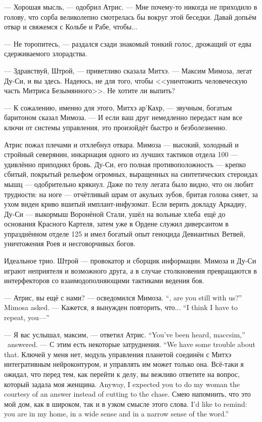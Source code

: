 --- Хорошая мысль, --- одобрил Атрис.
--- Мне почему-то никогда не приходило в голову, что сорба великолепно смотрелась бы вокруг этой беседки.
Давай допьём отвар и свяжемся с Кольбе и Рабе, чтобы...

--- Не торопитесь, --- раздался сзади знакомый тонкий голос, дрожащий от едва сдерживаемого злорадства.

--- Здравствуй, Штрой, --- приветливо сказала Митхэ.
--- Максим Мимоза, легат Ду-Си, и вы здесь.
Надеюсь, не для того, чтобы <<уничтожить человеческую часть Митриса Безымянного>>.
Не хотите ли выпить?

--- К сожалению, именно для этого, Митхэ ар’Кахр, --- звучным, богатым баритоном сказал Мимоза.
--- И если ваш друг немедленно передаст нам все ключи от системы управления, это произойдёт быстро и безболезненно.

Атрис пожал плечами и отхлебнул отвара.
Мимоза --- высокий, холодный и стройный северянин, инкарнация одного из лучших тактиков отдела 100 --- удивлённо приподнял бровь.
Ду-Си, его полная противоположность --- крепко сбитый, покрытый рельефом огромных, выращенных на синтетических стероидах мышц --- одобрительно крякнул.
Даже по телу легата было видно, что он любит трудности: на ноге --- отчётливый шрам от акульих зубов, бритая голова сияет, за ухом виден криво вшитый имплант-инфузомат.
Если верить докладу Аркадиу, Ду-Си --- выкормыш Воронёной Стали, ушёл на вольные хлеба\FM\ ещё до основания Красного Картеля, затем уже в Ордене служил диверсантом в упразднённом отделе 125 и имел богатый опыт геноцида Девиантных Ветвей, уничтожения Роев и несговорчивых богов.

Идеальное трио.
Штрой --- провокатор и сборщик информации.
Мимоза и Ду-Си играют неприятеля и возможного друга, а в случае столкновения превращаются в интерфекторов со взаимодополняющими тактиками ведения боя.

{--- Атрис, вы ещё с нами? --- осведомился Мимоза.}
{``\Aatris{}, are you still with us?'' Mimosa asked.}
{--- Кажется, я вынужден повторить, что...}
{``I think I have to repeat, you---''}

{--- Я вас услышал, максим, --- ответил Атрис.}
{``You've been heard, maccsim,'' \Aatris\ answered.}
{--- С этим есть некоторые затруднения.}
{``We have some trouble about that.}
Ключей у меня нет, модуль управления планетой соединён с Митхэ интегративным нейроконтуром, и управлять им может только она.
{Всё-таки я ожидал, что перед тем, как перейти к делу, вы вежливо ответите на вопрос, который задала моя женщина.}
{Anyway, I expected you to do my woman the courtesy of an answer instead of cutting to the chase.}
{Смею напомнить, что это мой дом, как в широком, так и в узком смысле этого слова.}
{I'd like to remind: you are in my home, in a wide sense and in a narrow sense of the word.''}

